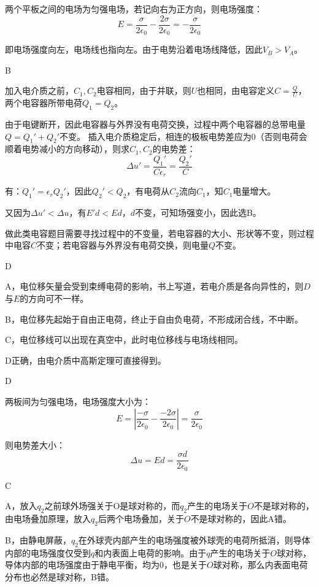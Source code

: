 \documentclass[b5paper,opensource,sourcefont,parskip]{qyxf-book}
\begin{document}
\solve  %
两个平板之间的电场为匀强电场，若记向右为正方向，则电场强度：
\[E=\frac{\sigma}{2\epsilon_0}-\frac{2\sigma}{2\epsilon_0}=-\frac{\sigma}{2\epsilon_0}\]

即电场强度向左，电场线也指向左。由于电势沿着电场线降低，因此$V_B>V_A$。

B

\solve 加入电介质之前，$ C_1,C_2 $电容相同，由于并联，则$ U $也相同，由电容定义$ C=\frac{Q}{U} $，两个电容器所带电荷$ Q_1=Q_2 $。

由于电键断开，因此电容器与外界没有电荷交换，过程中两个电容器的总带电量$ Q=Q_1'+Q_2' $不变。
插入电介质稳定后，相连的极板电势差应为$ 0 $（否则电荷会顺着电势减小的方向移动），则求$ C_1,C_2 $的电势差：
\[\Delta u'=\frac{Q_1'}{C\epsilon_r}=\frac{Q_2'}{C}\]

有：$Q_1'=\epsilon_r Q_2'$，因此$Q_2'<Q_2$，有电荷从$C_2$流向$C_1$，知$C_1$电量增大。

又因为$\Delta u'<\Delta u$，有$E'd<Ed$，$d$不变，可知场强变小，因此选B。

\note 做此类电容题目需要寻找过程中的不变量，若电容器的大小、形状等不变，则过程中电容$ C $不变；若电容器与外界没有电荷交换，则电量$ Q $不变。

D

\solve A，电位移矢量会受到束缚电荷的影响，书上写道，若电介质是各向异性的，则$ D $与$ E $的方向可不一样。

B，电位移先起始于自由正电荷，终止于自由负电荷，不形成闭合线，不中断。

C，电位移线可以出现在真空中，此时电位移线与电场线相同。

D正确，由电介质中高斯定理可直接得到。

D

\solve 两板间为匀强电场，电场强度大小为：
\[E=\left|\frac{-\sigma}{2\epsilon_0}-\frac{-2\sigma}{2\epsilon_0}\right|=\frac{\sigma}{2\epsilon_0}\]

则电势差大小：
\[\Delta u=Ed=\frac{\sigma d}{2\epsilon_0}\]

C

\solve A，放入$q_2$之前球外场强关于O是球对称的，而$q_2$产生的电场关于$O$不是球对称的，由电场叠加原理，放入$q_2$后两个电场叠加，关于$O$不是球对称的，因此A错。

B，由静电屏蔽，$q_2$在外球壳内部产生的电场强度被外球壳的电荷所抵消，则导体内部的电场强度仅受到$q$和内表面上电荷的影响。由于$q$产生的电场关于$O$球对称，导体内部的电场强度由于静电平衡，均为$0$，也是关于$O$球对称，那么内表面电荷分布也必然是球对称，B错。
\end{document}
